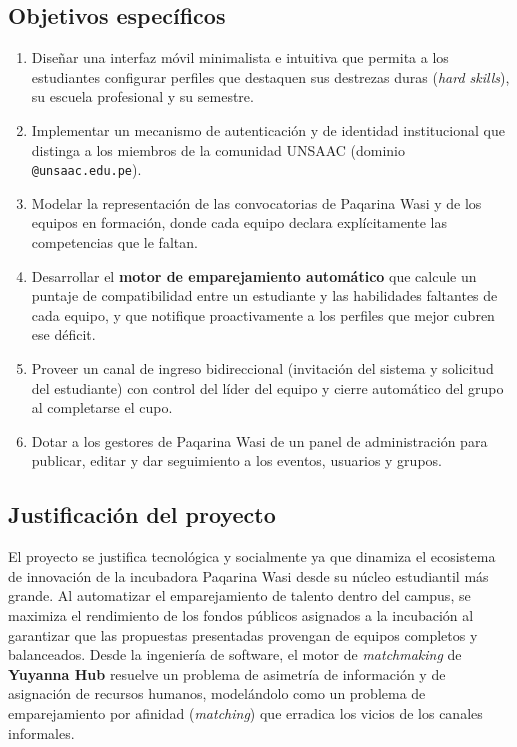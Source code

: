 \documentclass[12pt,a4paper]{article}
\begin{document}
\subsection{Objetivos específicos}
\begin{enumerate}[label=\textbf{OE-\arabic*.},leftmargin=1.9cm]
    \item Diseñar una interfaz móvil minimalista e intuitiva que permita a los estudiantes configurar perfiles que destaquen sus destrezas duras (\emph{hard skills}), su escuela profesional y su semestre.
    \item Implementar un mecanismo de autenticación y de identidad institucional que distinga a los miembros de la comunidad UNSAAC (dominio \texttt{@unsaac.edu.pe}).
    \item Modelar la representación de las convocatorias de Paqarina Wasi y de los equipos en formación, donde cada equipo declara explícitamente las competencias que le faltan.
    \item Desarrollar el \textbf{motor de emparejamiento automático} que calcule un puntaje de compatibilidad entre un estudiante y las habilidades faltantes de cada equipo, y que notifique proactivamente a los perfiles que mejor cubren ese déficit.
    \item Proveer un canal de ingreso bidireccional (invitación del sistema y solicitud del estudiante) con control del líder del equipo y cierre automático del grupo al completarse el cupo.
    \item Dotar a los gestores de Paqarina Wasi de un panel de administración para publicar, editar y dar seguimiento a los eventos, usuarios y grupos.
\end{enumerate}

\subsection{Justificación del proyecto}
El proyecto se justifica tecnológica y socialmente ya que dinamiza el ecosistema de innovación de la incubadora Paqarina Wasi desde su núcleo estudiantil más grande. Al automatizar el emparejamiento de talento dentro del campus, se maximiza el rendimiento de los fondos públicos asignados a la incubación al garantizar que las propuestas presentadas provengan de equipos completos y balanceados. Desde la ingeniería de software, el motor de \emph{matchmaking} de \textbf{Yuyanna Hub} resuelve un problema de asimetría de información y de asignación de recursos humanos, modelándolo como un problema de emparejamiento por afinidad (\emph{matching}) que erradica los vicios de los canales informales.
\end{document}
